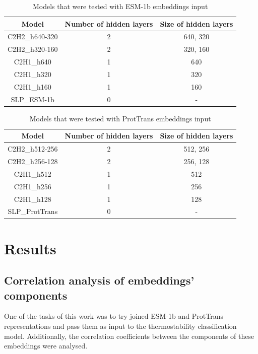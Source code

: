 \documentclass[12pt]{article}
\begin{document}
	\begin{table}[h!]
		\caption{Models that were tested with ESM-1b embeddings input}
		\vspace{0.2cm}
		\centering
		\begin{tabular}{ | c | c c | }
			\hline 
			Model & Number of hidden layers & Size of hidden layers \\
			\hline 
			C2H2\_h640-320 & 2 & 640, 320 \\
			C2H2\_h320-160 & 2 & 320, 160 \\
			C2H1\_h640 & 1 & 640 \\
			C2H1\_h320 & 1 & 320 \\
			C2H1\_h160 & 1 & 160 \\
			SLP\_ESM-1b & 0 & - \\
			\hline    
		\end{tabular}
		\label{table:modelArchitecturesESM}
	\end{table}

	\begin{table}[h!]
		\caption{Models that were tested with ProtTrans embeddings input}
		\vspace{0.2cm}
		\centering
		\begin{tabular}{ | c | c c | }
			\hline 
			Model & Number of hidden layers & Size of hidden layers \\
			\hline 
			C2H2\_h512-256 & 2 & 512, 256 \\
			C2H2\_h256-128 & 2 & 256, 128 \\
			C2H1\_h512 & 1 & 512 \\
			C2H1\_h256 & 1 & 256 \\
			C2H1\_h128 & 1 & 128 \\
			SLP\_ProtTrans & 0 & - \\
			\hline    
		\end{tabular}
		\label{table:modelArchitecturesPT}
	\end{table}

	\newpage

	\section{Results}

	\subsection{Correlation analysis of embeddings' components}

	One of the tasks of this work was to try joined ESM-1b and ProtTrans 
	representations and pass them as input to the thermostability 
	classification model. Additionally, the correlation 
	coefficients between the components of these embeddings were analysed. 
\end{document}
